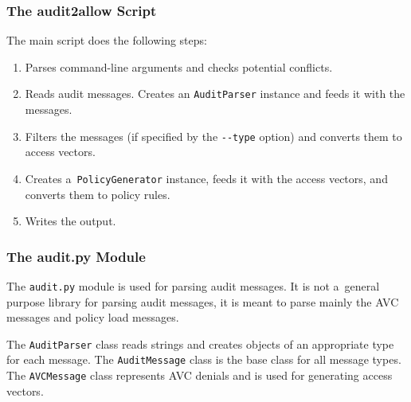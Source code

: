 \subsubsection{The audit2allow Script}

The main script does the following steps:
\begin{enumerate}
    \item Parses command-line arguments and checks potential conflicts.
    \item Reads audit messages. Creates an \texttt{AuditParser} instance and
        feeds it with the messages.
    \item Filters the messages (if specified by the \texttt{-{}-type} option)
        and converts them to access vectors.
    \item Creates a~\texttt{PolicyGenerator} instance, feeds it with the access
        vectors, and converts them to policy rules.
    \item Writes the output.
\end{enumerate}

\subsubsection{The audit.py Module}

The \texttt{audit.py} module is used for parsing audit messages. It is not
a~general purpose library for parsing audit messages, it is meant to parse
mainly the AVC messages and policy load messages.

The \texttt{AuditParser} class reads strings and creates objects of an
appropriate type for each message. The \texttt{AuditMessage} class is the base
class for all message types. The \texttt{AVCMessage} class represents AVC
denials and is used for generating access vectors.

